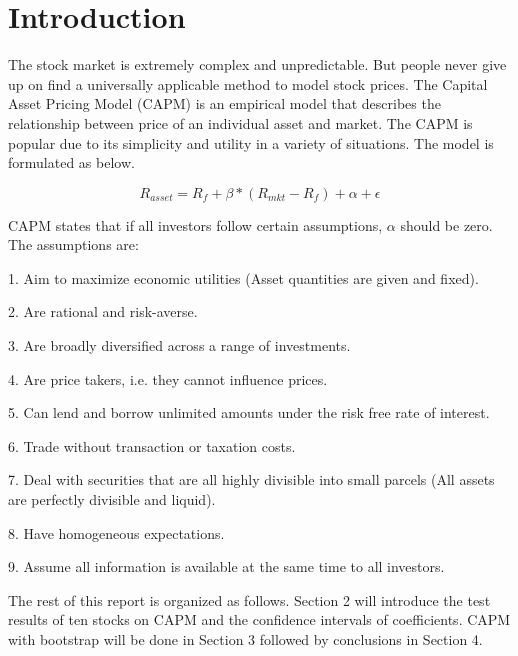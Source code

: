 \documentclass[11pt, conference]{IEEEtran}
\begin{document}
\section{Introduction}
The stock market is extremely complex and unpredictable. But people never give up on find a universally applicable method to model stock prices. The Capital Asset Pricing Model (CAPM) is an empirical model that describes the relationship between price of an individual asset and market. The CAPM is popular due to its simplicity and utility in a variety of situations. The model is formulated as below. 

$$ R_{asset} = R_f + \beta*(R_{mkt} - R_f) +\alpha + \epsilon $$

CAPM states that if all investors follow certain assumptions, $\alpha$ should be zero. The assumptions are: 

1. Aim to maximize economic utilities (Asset quantities are given and fixed).

2. Are rational and risk-averse.

3. Are broadly diversified across a range of investments.

4. Are price takers, i.e. they cannot influence prices.

5. Can lend and borrow unlimited amounts under the risk free rate of interest.

6. Trade without transaction or taxation costs.

7. Deal with securities that are all highly divisible into small parcels (All assets are perfectly divisible and liquid).

8. Have homogeneous expectations.

9. Assume all information is available at the same time to all investors.

The rest of this report is organized as follows. Section 2 will introduce the test results of ten stocks on CAPM and the confidence intervals of coefficients. CAPM with bootstrap will be done in Section 3 followed by conclusions in Section 4.  


%
%
\end{document}
